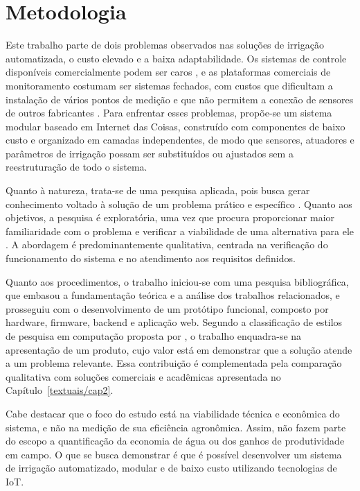 \chapter{Metodologia}
\label{textuais/cap3}

Este trabalho parte de dois problemas observados nas soluções de irrigação automatizada, o custo elevado e a baixa adaptabilidade. Os sistemas de controle disponíveis comercialmente podem ser caros \cite{campos2021}, e as plataformas comerciais de monitoramento costumam ser sistemas fechados, com custos que dificultam a instalação de vários pontos de medição e que não permitem a conexão de sensores de outros fabricantes \cite{puig2022}. Para enfrentar esses problemas, propõe-se um sistema modular baseado em Internet das Coisas, construído com componentes de baixo custo e organizado em camadas independentes, de modo que sensores, atuadores e parâmetros de irrigação possam ser substituídos ou ajustados sem a reestruturação de todo o sistema.
 
Quanto à natureza, trata-se de uma pesquisa aplicada, pois busca gerar conhecimento voltado à solução de um problema prático e específico \cite{gil2022}. Quanto aos objetivos, a pesquisa é exploratória, uma vez que procura proporcionar maior familiaridade com o problema e verificar a viabilidade de uma alternativa para ele \cite{gil2022}. A abordagem é predominantemente qualitativa, centrada na verificação do funcionamento do sistema e no atendimento aos requisitos definidos.
 
Quanto aos procedimentos, o trabalho iniciou-se com uma pesquisa bibliográfica, que embasou a fundamentação teórica e a análise dos trabalhos relacionados, e prosseguiu com o desenvolvimento de um protótipo funcional, composto por hardware, firmware, backend e aplicação web. Segundo a classificação de estilos de pesquisa em computação proposta por , o trabalho enquadra-se na apresentação de um produto, cujo valor está em demonstrar que a solução atende a um problema relevante. Essa contribuição é complementada pela comparação qualitativa com soluções comerciais e acadêmicas apresentada no Capítulo~\ref{textuais/cap2}.
 
Cabe destacar que o foco do estudo está na viabilidade técnica e econômica do sistema, e não na medição de sua eficiência agronômica. Assim, não fazem parte do escopo a quantificação da economia de água ou dos ganhos de produtividade em campo. O que se busca demonstrar é que é possível desenvolver um sistema de irrigação automatizado, modular e de baixo custo utilizando tecnologias de IoT.

